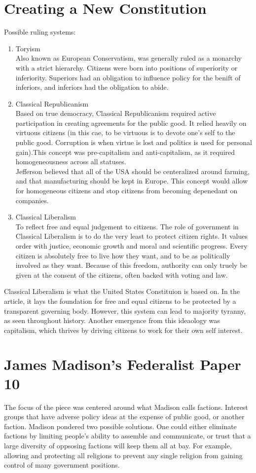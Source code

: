 \documentclass{article}
\begin{document}
\section{Creating a New Constitution}
Possible ruling systems:
\begin{enumerate}
  \item Toryism\\ Also known as European Conservatism, was generally ruled as a monarchy with a strict hierarchy. Citizens were born into positions of superiority or inferiority. Superiors had an obligation to influence policy for the benift of inferiors, and inferiors had the obligation to abide.
  \item Classical Republicanism\\ Based on true democracy, Classical Republicanism required active participation in creating agreements for the public good. It relied heavily on virtuous citizens (in this cae, to be virtuous is to devote one's self to the public good. Corruption is when virtue is lost and politics is used for personal gain).This concept was pre-capitalism and anti-capitalism, as it required homogeneousness across all statuses.\\ Jefferson believed that all of the USA should be centeralized around farming, and that manufacturing should be kept in Europe. This concept would allow for homogeneous citizens and stop citizens from becoming depenedant on companies.
  \item Classical Liberalism\\ To reflect free and equal judgement to citizens. The role of government in Classical Liberalism is to do the very least to protect citizen rights. It values order with justice, economic growth and moral and scientific progress. Every citizen is absolutely free to live how they want, and to be as politically involved as they want. Because of this freedom, authority can only truely be given at the consent of the citizens, often backed with voting and law.
\end{enumerate}

Classical Liberalism is what the United States Constituion is based on. In the article, it lays the foundation for free and equal citizens to be protected by a transparent governing body. However, this system can lead to majority tyranny, as seen throughout history. Another emergence from this ideaology was capitalism, which thrives by driving citizens to work for their own self interest.

\section{James Madison's Federalist Paper 10}
The focus of the piece was centered around what Madison calls factions. Interest groups that have adverse policy ideas at the expense of public good, or another faction. Madison pondered two possible solutions. One could either eliminate factions by limiting people's ability to assemble and communicate, or trust that a large diversity of oppsosing factions will keep them all at bay. For example, allowing and protecting all religions to prevent any single religion from gaining control of many government positions.
\end{document}
